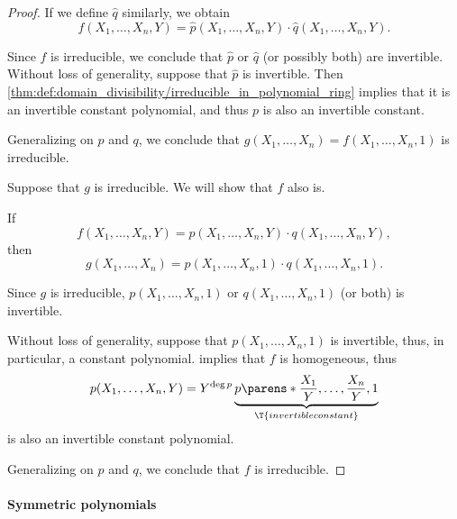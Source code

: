 \begin{proof}
  If we define \( \widehat{q} \) similarly, we obtain
  \begin{equation*}
    f(X_1, \ldots, X_n, Y) = \widehat p(X_1, \ldots, X_n, Y) \cdot \widehat q(X_1, \ldots, X_n, Y).
  \end{equation*}

  Since \( f \) is irreducible, we conclude that \( \widehat{p} \) or \( \widehat{q} \) (or possibly both) are invertible. Without loss of generality, suppose that \( \widehat{p} \) is invertible. Then \cref{thm:def:domain_divisibility/irreducible_in_polynomial_ring} implies that it is an invertible constant polynomial, and thus \( p \) is also an invertible constant.

  Generalizing on \( p \) and \( q \), we conclude that \( g(X_1, \ldots, X_n) = f(X_1, \ldots, X_n, 1) \) is irreducible.

  \NecessitySubProof Suppose that \( g \) is irreducible. We will show that \( f \) also is.

  If
  \begin{equation*}
    f(X_1, \ldots, X_n, Y) = p(X_1, \ldots, X_n, Y) \cdot q(X_1, \ldots, X_n, Y),
  \end{equation*}
  then
  \begin{equation*}
    g(X_1, \ldots, X_n) = p(X_1, \ldots, X_n, 1) \cdot q(X_1, \ldots, X_n, 1).
  \end{equation*}

  Since \( g \) is irreducible, \( p(X_1, \ldots, X_n, 1) \) or \( q(X_1, \ldots, X_n, 1) \) (or both) is invertible.

  Without loss of generality, suppose that \( p(X_1, \ldots, X_n, 1) \) is invertible, thus, in particular, a constant polynomial.  implies that \( f \) is homogeneous, thus
  \begin{equation*}
    p(X_1, \ldots, X_n, Y) = Y^{\deg p} \underbrace{p\parens*{ \frac {X_1} Y, \ldots, \frac {X_n} Y, 1 }}_{\T{invertible constant}}
  \end{equation*}
  is also an invertible constant polynomial.

  Generalizing on \( p \) and \( q \), we conclude that \( f \) is irreducible.
\end{proof}

\paragraph{Symmetric polynomials}

